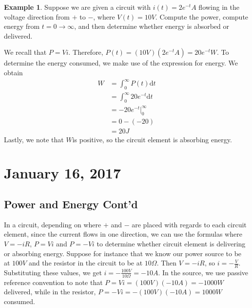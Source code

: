 \documentclass[11pt]{article}
\theoremstyle{plain} %
\theoremstyle{definition}
\theoremstyle{example}
\newtheorem*{example}{Example}
\theoremstyle{remark}
\begin{document}
\begin{example}
Suppose we are given a circuit with $i(t) = 2e^{-t}A$ flowing in the voltage direction from $+$ to $-$, where $V(t) = 10V$. Compute the power, compute energy from $t=0\rightarrow \infty$, and then determine whether energy is absorbed or delivered. 
\end{example}
We recall that $P = Vi$. Therefore, $P(t) = (10V)(2e^{-t}A) = 20e^{-t}W$. To determine the energy consumed, we make use of the expression for energy. We obtain
\begin{align*}
W &= \int_0^{\infty}P(t) \mathrm d t \\
&= \int_0^{\infty}20e^{-t}\mathrm d t\\
&= -20e^{-t}\Big|_0^{\infty}\\
&= 0 - (-20)\\
&= 20 J
\end{align*}
Lastly, we note that $W$is positive, so the circuit element is absorbing energy. 

\section{January 16, 2017}

\subsection{Power and Energy Cont'd}

In a circuit, depending on where $+$ and $-$ are placed with regards to each circuit element, since the current flows in one direction, we can use the formulas where $V = -iR$, $P =V i
$ and $P = -V i$ to determine whether circuit element is delivering or absorbing energy. Suppose for instance that we know our power source to be at $100V$ and the resistor in the circuit to be at $10 \Omega$. Then $V = -iR$, so $i = -\frac{V}{R}$. Substituting these values, we get $i = -\frac{100V}{10\Omega} = -10A$. In the source, we use passive reference convention to note that $P = Vi = (100V)(-10A) = -1000W$ delivered, while in the resistor, $P = -Vi = -(100V)(-10A)= 1000W$ consumed. 
\end{document}
